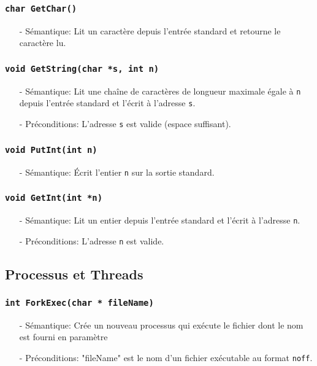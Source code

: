 \documentclass[11pt]{article}
\theoremstyle{definition}
\theoremstyle{definition}
\begin{document}
\subsubsection{\texttt{char GetChar()}}
\begin{itemize}
\item[-] Sémantique: Lit un caractère depuis l'entrée standard et retourne le caractère lu.
\end{itemize}

\subsubsection{\texttt{void GetString(char *s, int n)}}
\begin{itemize}
\item[-] Sémantique:
  Lit une chaîne de caractères de longueur maximale égale à \texttt{n} depuis l'entrée standard et
  l'écrit à l'adresse \texttt{s}.
\item[-] Préconditions: L'adresse \texttt{s} est valide (espace suffisant).
\end{itemize}

\subsubsection{\texttt{void PutInt(int n)}}
\begin{itemize}
\item[-] Sémantique: Écrit l'entier \texttt{n} sur la sortie standard.
\end{itemize}

\subsubsection{\texttt{void GetInt(int *n)}}
\begin{itemize}
\item[-] Sémantique: Lit un entier depuis l'entrée standard et l'écrit à l'adresse \texttt{n}.
\item[-] Préconditions: L'adresse \texttt{n} est valide.
\end{itemize}

\subsection{Processus et Threads}

\subsubsection{\texttt{int ForkExec(char * fileName)}}
 \begin{itemize}
 \item[-] Sémantique: Crée un nouveau processus qui exécute le fichier dont le nom est fourni en paramètre
\item[-] Préconditions: "fileName" est le nom d'un fichier exécutable au format \texttt{noff}.
 \end{itemize}
\end{document}
